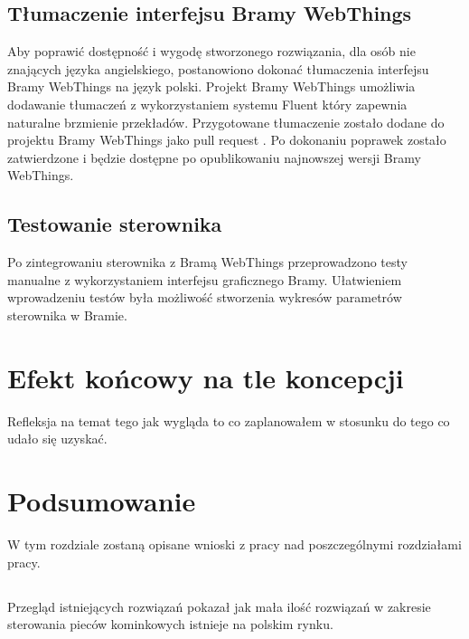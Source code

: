 \documentclass[11pt]{report}
\begin{document}
 \section{Tłumaczenie interfejsu Bramy WebThings}
 Aby poprawić dostępność i wygodę stworzonego rozwiązania, dla osób nie znających języka angielskiego, postanowiono dokonać tłumaczenia interfejsu Bramy WebThings na język polski. Projekt Bramy WebThings umożliwia dodawanie tłumaczeń z wykorzystaniem systemu Fluent \cite{fluent2020} który zapewnia naturalne brzmienie przekładów. Przygotowane tłumaczenie zostało dodane do projektu Bramy WebThings jako pull request \cite{gatewaypl2019}. Po dokonaniu poprawek zostało zatwierdzone i będzie dostępne po opublikowaniu najnowszej wersji Bramy WebThings.
 
  \section{Testowanie sterownika}
 Po zintegrowaniu sterownika z Bramą WebThings przeprowadzono testy manualne z wykorzystaniem interfejsu graficznego Bramy. Ułatwieniem wprowadzeniu testów była możliwość stworzenia wykresów parametrów sterownika w Bramie.


 
 
 \chapter{Efekt końcowy na tle koncepcji}
 Refleksja na temat tego jak wygląda to co zaplanowałem w stosunku do tego co udało się uzyskać.
 
 
 
 \chapter{Podsumowanie}
W tym rozdziale zostaną opisane wnioski z pracy nad poszczególnymi rozdziałami pracy.
\section{}
Przegląd istniejących rozwiązań pokazał jak mała ilość rozwiązań w zakresie sterowania pieców kominkowych istnieje na polskim rynku.
\end{document}
